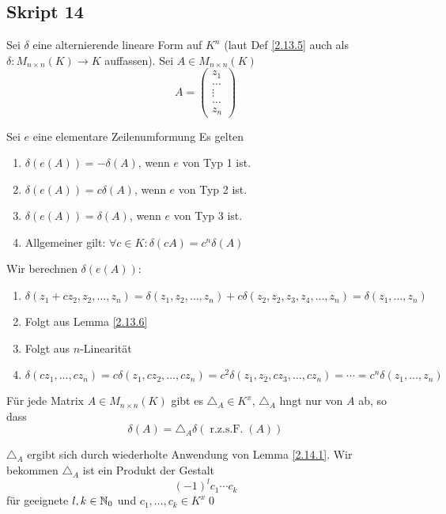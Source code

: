 \subsection{Skript 14}
Sei $ \delta $ eine alternierende lineare Form auf $ K^n $ (laut Def \ref{2.13.5} auch als $ \delta : M_{n \times n} (K) \to K $ auffassen).
Sei $ A \in M_{n \times n} (K) $ 
\[
	A = \begin{pmatrix} z_1 \\ \hdots \\ \vdots \\ \hdots \\ z_n \end{pmatrix} 
\]

\begin{sublemma}
	Sei $ e $ eine elementare Zeilenumformung
	Es gelten
	\begin{enumerate}[label=(\roman*)]
		\item $ \delta ( e (A) ) = - \delta(A) $, wenn $ e $ von Typ 1 ist.
		\item $ \delta( e (A) ) = c \delta(A) $, wenn $ e $ von Typ 2 ist.
		\item $ \delta ( e(A)) = \delta(A) $, wenn $ e $ von Typ 3 ist.
		\item Allgemeiner gilt: $ \forall c \in K : \delta (cA) = c^{n} \delta(A) $
	\end{enumerate}
\end{sublemma}
\begin{subproof*}
	Wir berechnen $ \delta( e ( A ) ) $:
	\begin{enumerate}[label=(\roman*)]
		\item $ \delta( z_1 + cz_2, z_2, \dotsc, z_n) = \delta(z_1, z_2, \dotsc, z_n) + c \delta( z_2, z_2, z_3, z_4, \dotsc, z_n) = \delta(z_1, \dotsc, z_n) $
		\item Folgt aus Lemma \ref{2.13.6}
		\item Folgt aus $ n $-Linearität
		\item $ \delta(c z_1, \dotsc, c z_n) = c \delta(z_1, cz_2, \dotsc, cz_n) = c^2 \delta(z_1, z_2, cz_3, \dotsc, cz_n) = \dotsb = c^n \delta(z_1, \dotsc, z_n) $
	\end{enumerate}
\end{subproof*}

\begin{sublemma}
	Für jede Matrix $ A \in M_{n \times n} (K) $ gibt es $ \triangle_A \in K^{x} $, $ \triangle_A $ hngt nur von $ A $ ab, so dass
	\[
		\delta(A) = \triangle_A \delta(\operatorname{r.z.s.F.} (A))
	\]
\end{sublemma}
\begin{subproof*}
	$ \triangle_A $ ergibt sich durch wiederholte Anwendung von Lemma \ref{2.14.1}.
	Wir bekommen $ \triangle_A $ ist ein Produkt der Gestalt
	\[
		(-1)^{l} c_1 \dotsb c_k
	\]
	für geeignete $ l, k \in \mathbb{N} _0 $ und $ c_1, \dotsc, c_k \in K^x $\qed
\end{subproof*}

